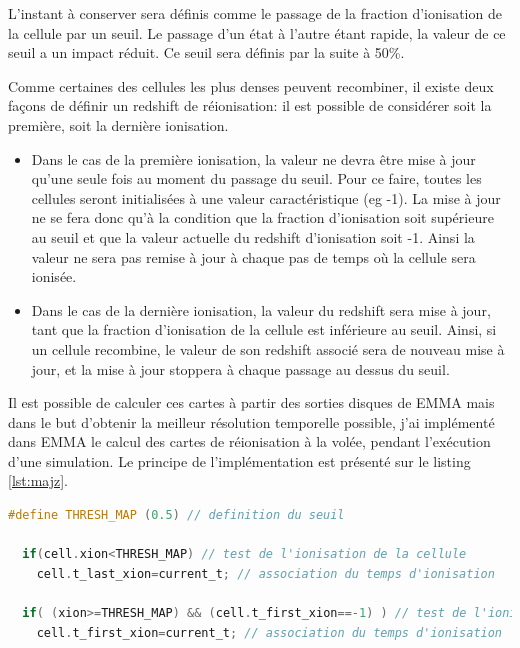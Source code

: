 L'instant à conserver sera définis comme le passage de la fraction d'ionisation de la cellule par un seuil.
Le passage d'un état à l'autre étant rapide, la valeur de ce seuil a un impact réduit.
Ce seuil sera définis par la suite à 50\%.

Comme certaines des cellules les plus denses peuvent recombiner, il existe deux façons de définir un redshift de réionisation: il est possible de considérer soit la première, soit la dernière ionisation.

\begin{itemize}
\item Dans le cas de la première ionisation, la valeur ne devra être mise à jour qu'une seule fois au moment du passage du seuil.
Pour ce faire, toutes les cellules seront initialisées à une valeur caractéristique (eg -1).
La mise à jour ne se fera donc qu'à la condition que la fraction d'ionisation soit supérieure au seuil et que la valeur actuelle du redshift d'ionisation soit -1.
Ainsi la valeur ne sera pas remise à jour à chaque pas de temps où la cellule sera ionisée. 

\item Dans le cas de la dernière ionisation, la valeur du redshift sera mise à jour, tant que la fraction d'ionisation de la cellule est inférieure au seuil.
Ainsi, si un cellule recombine, le valeur de son redshift associé sera de nouveau mise à jour, et la mise à jour stoppera à chaque passage au dessus du seuil.
\end{itemize}

\clearpage
Il est possible de calculer ces cartes à partir des sorties disques de EMMA mais dans le but d'obtenir la meilleur résolution temporelle possible, j'ai implémenté dans EMMA le calcul des cartes de réionisation à la volée, pendant l'exécution d'une simulation.
Le principe de l'implémentation est présenté sur le listing \ref{lst:majz}.

\begin{lstlisting}[float=bth,language=c,frame=tb,caption={Mise a jour du redshift de reionisation},label=lst:majz]
  #define THRESH_MAP (0.5) // definition du seuil

  if(cell.xion<THRESH_MAP) // test de l'ionisation de la cellule
    cell.t_last_xion=current_t; // association du temps d'ionisation 

  if( (xion>=THRESH_MAP) && (cell.t_first_xion==-1) ) // test de l'ionisation de la cellule et de premiere ionisation
    cell.t_first_xion=current_t; // association du temps d'ionisation 
\end{lstlisting}

